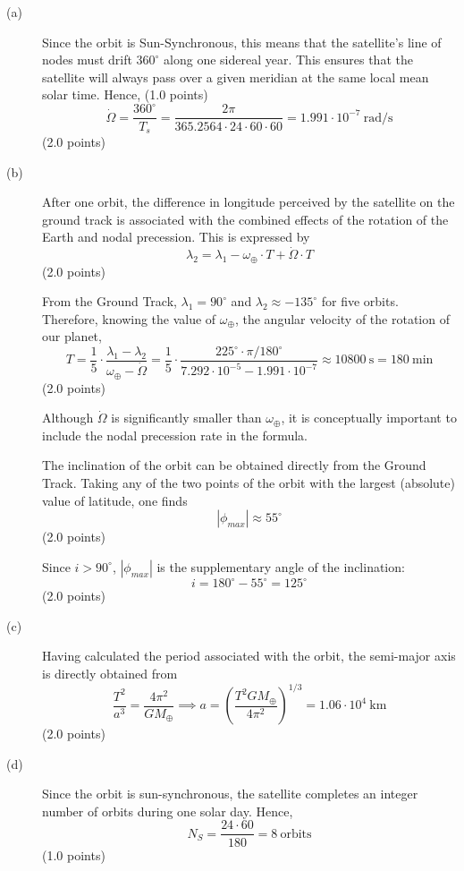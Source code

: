 \begin{description}
\item[(a)] Since the orbit is Sun-Synchronous, this means that the satellite's
  line of nodes must drift $360^\circ$ along one sidereal year. This ensures
  that the satellite will always pass over a given meridian at the same local
  mean solar time. Hence, \hfill(1.0 points)
  \[
    \dot\Omega = \frac{360^\circ}{T_s}
      = \frac{2\pi}{365.2564\cdot24\cdot60\cdot60}
      = 1.991\cdot10^{-7}\ \mathrm{rad/s}
  \]
  \hfill(2.0 points)

\item[(b)] After one orbit, the difference in longitude perceived by the
  satellite on the ground track is associated with the combined effects of the
  rotation of the Earth and nodal precession. This is expressed by
  \[
    \lambda_2 = \lambda_1 - \omega_\oplus\cdot T + \dot\Omega\cdot T
  \]
  \hfill(2.0 points)

  From the Ground Track, $\lambda_1 = 90^\circ$ and
  $\lambda_2 \approx -135^\circ$ for five orbits. Therefore, knowing the value
  of $\omega_\oplus$, the angular velocity of the rotation of our planet,
  \[
    T = \frac{1}{5}\cdot\frac{\lambda_1 - \lambda_2}{\omega_\oplus - \dot\Omega}
      = \frac{1}{5}\cdot
        \frac{225^\circ\cdot\pi/180^\circ}
             {7.292\cdot10^{-5} - 1.991\cdot10^{-7}}
      \approx 10800\ \mathrm{s} = 180\ \mathrm{min}
  \]
  \hfill(2.0 points)

  Although $\dot\Omega$ is significantly smaller than $\omega_\oplus$, it is
  conceptually important to include the nodal precession rate in the formula.

  The inclination of the orbit can be obtained directly from the Ground
  Track. Taking any of the two points of the orbit with the largest (absolute)
  value of latitude, one finds
  \[
    |\phi_{max}| \approx 55^\circ
  \]
  \hfill(2.0 points)

  Since $i > 90^\circ$, $|\phi_{max}|$ is the supplementary angle of the
  inclination:
  \[
    i = 180^\circ - 55^\circ = 125^\circ
  \]
  \hfill(2.0 points)

\item[(c)] Having calculated the period associated with the orbit, the
  semi-major axis is directly obtained from
  \[
    \frac{T^2}{a^3} = \frac{4\pi^2}{GM_\oplus}
    \implies
    a = \left(\frac{T^2 GM_\oplus}{4\pi^2}\right)^{1/3}
      = 1.06\cdot10^4\ \mathrm{km}
  \]
  \hfill(2.0 points)

\item[(d)] Since the orbit is sun-synchronous, the satellite completes an
  integer number of orbits during one solar day. Hence,
  \[
    N_S = \frac{24\cdot60}{180} = 8\ \text{orbits}
  \]
  \hfill(1.0 points)


\end{description}
